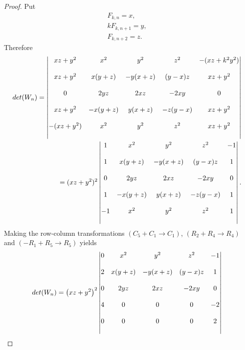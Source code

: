 \begin{proof}
Put
\begin{align*}
F_{k,n} = x,\\
k F_{k,n+1} = y,\\
F_{k,n+2} = z.
\end{align*}
Therefore
\begin{align*}
det(W_n) =\begin{vmatrix}
           \bigskip
            xz+y^2 & x^2& y^2& z^2 & -(xz+k^2 y^2) \\
             \bigskip
            xz+y^2  & x(y+z) & -y(x+z) & (y-x) z& xz+y^2 \\
             \bigskip
            0 & 2yz& 2 xz & -2xy & 0 \\
            \bigskip
            xz+y^2  & - x(y+z) &y(x+z)& - z (y- x)& xz+y^2 \\
     \bigskip
            -(xz+y^2)  &  x^2 & y^2 &  z^2& xz+y^2\\        
\end{vmatrix}\\
= (xz+y^2)^2 \begin{vmatrix}
           \bigskip
            1 & x^2& y^2& z^2 & -1 \\
             \bigskip
            1  & x(y+z) & -y(x+z) & (y-x) z& 1 \\
             \bigskip
            0 & 2yz& 2 xz & -2xy & 0 \\
            \bigskip
            1  & - x(y+z) &y(x+z)& - z (y- x)& 1 \\
     \bigskip
            -1  &  x^2 & y^2 &  z^2& 1\\        
\end{vmatrix}.
\end{align*}
Making the row-column transformations $(C_5+C_1 \rightarrow C_1)$, $(R_2+R_4\rightarrow R_4)$ and $(- R_1 +R_5 \rightarrow R_5)$ yields
\begin{align*}
det(W_n) = \left( xz+y^2\right)^2 \begin{vmatrix}
           \bigskip
            0 & x^2& y^2& z^2 & -1 \\
             \bigskip
            2  & x(y+z) & -y(x+z) & (y-x) z& 1 \\
             \bigskip
            0 & 2yz& 2 xz & -2xy & 0 \\
            \bigskip
            4  & 0 &0& 0& -2 \\
     \bigskip
            0  &  0 & 0 &  0& 2\\        
\end{vmatrix}\\

\end{align*}
\end{proof}
